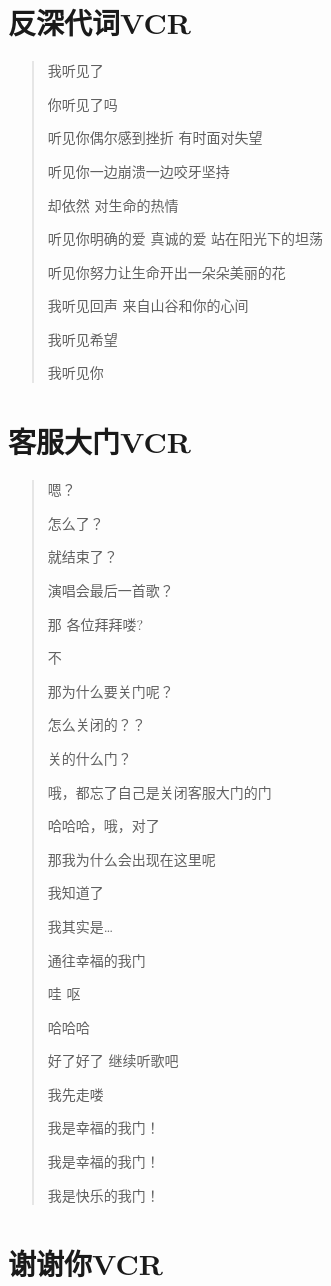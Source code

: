 \documentclass[
]{book}
\begin{document}
\section{反深代词VCR}\label{senself-vcr}

\begin{quote}
我听见了

你听见了吗

听见你偶尔感到挫折 有时面对失望

听见你一边崩溃一边咬牙坚持

却依然 对生命的热情

听见你明确的爱 真诚的爱 站在阳光下的坦荡

听见你努力让生命开出一朵朵美丽的花

我听见回声 来自山谷和你的心间

我听见希望

我听见你
\end{quote}

\section{客服大门VCR}\label{close-door-vcr}

\begin{quote}
嗯？

怎么了？

就结束了？

演唱会最后一首歌？

那 各位拜拜喽?

不

那为什么要关门呢？

怎么关闭的？？

关的什么门？

哦，都忘了自己是关闭客服大门的门

哈哈哈，哦，对了

那我为什么会出现在这里呢

我知道了

我其实是\ldots{}

通往幸福的我门

哇 呕

哈哈哈

好了好了 继续听歌吧

我先走喽

我是幸福的我门！

我是幸福的我门！

我是快乐的我门！
\end{quote}

\section{谢谢你VCR}\label{thank-you-vcr}
\end{document}
